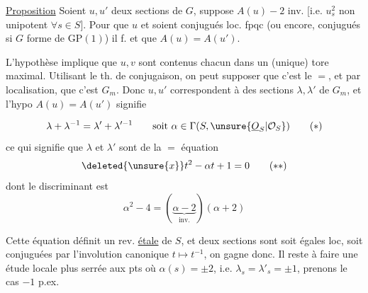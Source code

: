 \uline{Proposition} Soient $u,u'$ deux sections de $G$,   suppose $A(u)-2$  inv. [i.e. $u_s^2$ non unipotent $\forall s\in S$]. Pour que $u$ et  soient conjugués loc. fpqc (ou encore, conjugués si $G$ forme de $\mathrm{GP}(1)$) il f. et  que $A(u)=A(u')$.

  L'hypothèse  implique que $u,v$ sont contenus chacun dans un (unique) tore maximal. Utilisant le th. de conjugaison, on peut supposer que c'est le $=$, et par localisation, que c'est $G_m$. Donc $u,u'$ correspondent à des sections $\lambda,\lambda'$ de $G_m$, et l'hypo $A(u)=A(u')$ signifie

\[
\lambda+\lambda^{-1}=\lambda'+\lambda'^{-1}\qquad\text{soit }\alpha\in\Gamma(S,\unsure{\underline O_S|\mathcal O_S})\tag*{$(*)$}
\]
ce qui signifie que $\lambda$ et $\lambda'$ sont   de la $=$ équation
\[
\deleted{\unsure{x}}t^2-\alpha t+1=0\tag*{$(**)$}
\]
dont le discriminant est
\[
\alpha^2-4=(\underbrace{\alpha-2}_{\text{inv.}})(\alpha+2)
\]

   Cette équation définit un rev. \uline{étale} de $S$, et  deux sections sont soit égales loc, soit conjuguées par l'involution canonique $t\longmapsto t^{-1}$, on gagne donc. Il reste à faire une étude locale  plus serrée aux pts où $\alpha(s)=\pm2$, i.e. $\lambda_s=\lambda'_s=\pm1$, prenons le cas $-1$ p.ex.
